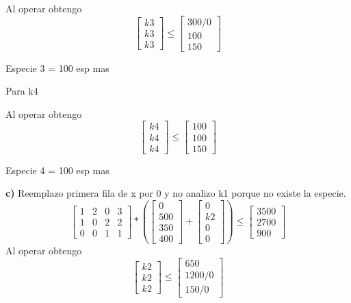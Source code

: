 \documentclass[12pt]{article}
\begin{document}
Al operar obtengo
\[
\begin{bmatrix}
k3 \\
k3 \\
k3
\end{bmatrix} \leq 
\begin{bmatrix}
300/0\\
100\\
150
\end{bmatrix}
\] 

Especie 3 = 100 esp mas

Para k4

Al operar obtengo
\[
\begin{bmatrix}
k4 \\
k4  \\
k4 
\end{bmatrix} \leq 
\begin{bmatrix}
100\\
100\\
150
\end{bmatrix}
\] 

Especie 4 = 100 esp mas

\textbf{c)} Reemplazo primera fila de x por 0 y no analizo k1 porque no existe la especie.
\[
\begin{bmatrix}
1 & 2 & 0 & 3 \\
1 & 0 & 2 & 2 \\
0 &0 & 1& 1 
\end{bmatrix}
*(
\begin{bmatrix}
0 \\
500\\
350\\
400
\end{bmatrix}
+
\begin{bmatrix}
0\\
k2\\
0\\
0

\end{bmatrix}
)\leq
\begin{bmatrix}
3500\\
2700\\
900
\end{bmatrix}
\] 
Al operar obtengo
\[
\begin{bmatrix}
k2 \\
k2 \\
k2
\end{bmatrix} \leq 
\begin{bmatrix}
650\\
1200/0\\
150/0
\end{bmatrix}
\] 
\end{document}
